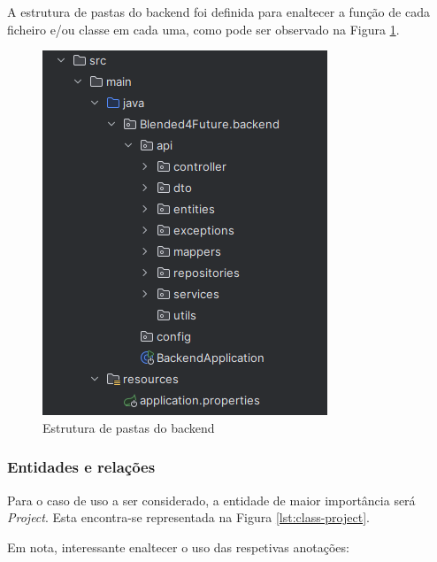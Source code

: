 A estrutura de pastas do backend foi definida para enaltecer a função de cada ficheiro e/ou classe em cada uma, como pode ser observado na Figura \ref{fig:folder-struct-backend}.

\begin{figure}[h!tbp]
    \centering
    \includegraphics[width=0.5\linewidth]{capitulos/cap4-implementacao/assets/fold-struct-backend.png}
    \caption{Estrutura de pastas do backend}
    \label{fig:folder-struct-backend}
\end{figure}

\subsubsection{Entidades e relações}

Para o caso de uso a ser considerado, a entidade de maior importância será \textit{Project}. Esta encontra-se representada na Figura \ref{lst:class-project}.

Em nota, interessante enaltecer o uso das respetivas anotações:

